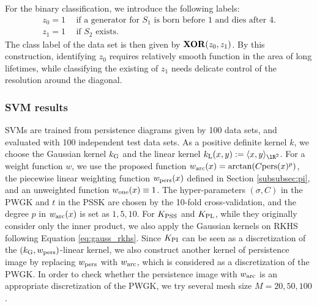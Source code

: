 \documentclass{article}
\newcommand{\pers}{{\rm pers}}
\providecommand{\inn}[2]{\langle #1, #2 \rangle}
\begin{document}
For the binary classification, we introduce the following labels:
\begin{align*}
z_{0}=1 &~~  \mbox{if a generator for $S_{1}$ is born before $1$ and dies after $4$.} \\
z_{1}=1 &~~ \mbox{if $S_2$ exists.}
\end{align*}
The class label of the data set is then given by ${\bf XOR}(z_0,z_1)$.
By this construction, identifying $z_{0}$ requires relatively smooth function in the area of long lifetimes, while classifying the existing of $z_{1}$ needs delicate control of the resolution around the diagonal.

\subsubsection{SVM results} 

SVMs are trained from persistence diagrams given by 100 data sets, and evaluated with 100 independent test data sets.  
As a positive definite kernel $k$, we choose the Gaussian kernel $k_{{\rm G}}$ and the linear kernel $k_{{\rm L}}(x,y):=\inn{x}{y}_{\lR^{2}}$.
For a weight function $w$, we use the proposed function $w_{{\rm arc}}(x)=\arctan (C \pers(x)^{p})$, the piecewise linear weighting function $w_{{\rm pers}}(x)$ defined in Section \ref{subsubsec:pi}, and an unweighted function $w_{{\rm one}}(x) \equiv 1$.
The hyper-parameters $(\sigma, C)$ in the PWGK and $t$ in the PSSK are chosen by the 10-fold cross-validation, and the degree $p$ in $w_{{\rm arc}}(x)$ is set as $1, 5, 10$.
For $K_{{\rm PSS}}$ and $K_{{\rm PL}}$, while they originally consider only the inner product, we also apply the Gaussian kernels on RKHS following Equation \eqref{eq:gauss_rkhs}.
Since $K_{{\rm PI}}$ can be seen as a discretization of the $(k_{{\rm G}},w_{{\rm pers}})$-linear kernel, we also construct another kernel of persistence image by replacing $w_{{\rm pers}}$ with $w_{{\rm arc}}$, which is considered as a discretization of the PWGK.
In order to check whether the persistence image with $w_{{\rm arc}}$ is an appropriate discretization of the PWGK, we try several mesh size $M=20,50,100$.
\end{document}
